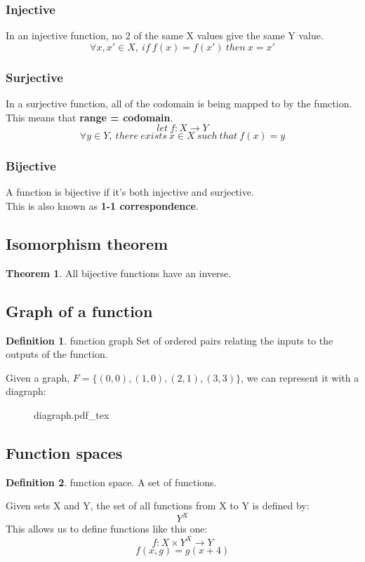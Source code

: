 \documentclass{article}
\theoremstyle{definition}
\newtheorem{df}{Definition}[section]
\newtheorem{thr}{Theorem}
\newcommand{\incfig}[1]{%
    \def\svgwidth{\columnwidth}
    {#1.pdf_tex}
}
\begin{document}
\subsubsection{Injective}
In an injective function, no 2 of the same X values give the same Y value.
\[\forall x,x' \in X,\ if\ f(x)=f(x')\ then\ x=x'\]

\subsubsection{Surjective}
In a surjective function, all of the codomain is being mapped to by the function.\\
This means that \textbf{range = codomain}.
\[let\ f: X \rightarrow Y\]
\[ \forall y \in Y,\ there\ exists\ x \in X\ such\ that\ f(x)=y\]

\subsubsection{Bijective}
A function is bijective if it's both injective and surjective.\\
This is also known as \textbf{1-1 correspondence}.

\subsection{Isomorphism theorem}
\begin{thr}
	All bijective functions have an inverse.
\end{thr}
\subsection{Graph of a function}
\begin{df}{function graph}
	Set of ordered pairs relating the inputs to the outputs of the function.
\end{df}

Given a graph, $F = \{(0,0), (1,0), (2,1), (3, 3)\}$, we can represent it with a diagraph:
\begin{figure}[H]
	\centering
	\incfig{diagraph}
\end{figure}
\subsection{Function spaces}
\begin{df}{function space.}
	A set of functions.
\end{df}

Given sets X and Y, the set of all functions from X to Y is defined by:
\[Y^X\]
This allows us to define functions like this one:
\[f: X \times Y^X \rightarrow Y\]
\[f(x,g) = g(x+4)\]
\end{document}
